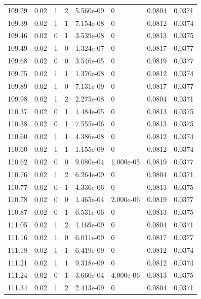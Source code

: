 \documentclass[preview]{standalone}
\begin{document}
{{{{{{{{{{{{{{{{{\begin{tabular}{L{1.2cm}C{1.2cm} C{0.3cm}C{0.5cm} C{1.4cm}C{1.4cm} C{1.4cm}C{1.4cm}}
  109.29  &  0.02  & 1     &  2 &  5.560e-09  & 0  & 0.0804 &  0.0371   \\ 
  109.39  &  0.02  & 1     &  1 &  7.154e-08  & 0  & 0.0812 &  0.0374   \\ 
  109.46  &  0.02  & 0     &  1 &  3.539e-08  & 0  & 0.0813 &  0.0375   \\ 
  109.49  &  0.02  & 1     &  0 &  1.324e-07  & 0  & 0.0817 &  0.0377   \\ 
  109.68  &  0.02  & 0     &  0 &  3.546e-05  & 0  & 0.0819 &  0.0377   \\ 
  109.75  &  0.02  & 1     &  1 &  1.370e-08  & 0  & 0.0812 &  0.0374   \\ 
  109.89  &  0.02  & 1     &  0 &  7.131e-09  & 0  & 0.0817 &  0.0377   \\ 
  109.98  &  0.02  & 1     &  2 &  2.275e-08  & 0  & 0.0804 &  0.0371   \\ 
  110.37  &  0.02  & 0     &  1 &  1.484e-05  & 0  & 0.0813 &  0.0375   \\ 
  110.38  &  0.02  & 0     &  1 &  7.555e-06  & 0  & 0.0813 &  0.0375   \\ 
  110.60  &  0.02  & 1     &  1 &  4.386e-08  & 0  & 0.0812 &  0.0374   \\ 
  110.60  &  0.02  & 1     &  1 &  1.155e-09  & 0  & 0.0812 &  0.0374   \\ 
  110.62  &  0.02  & 0     &  0 &  9.080e-04  & 1.000e-05  & 0.0819 &  0.0377   \\ 
  110.76  &  0.02  & 1     &  2 &  6.264e-09  & 0  & 0.0804 &  0.0371   \\ 
  110.77  &  0.02  & 0     &  1 &  4.336e-06  & 0  & 0.0813 &  0.0375   \\ 
  110.78  &  0.02  & 0     &  0 &  1.465e-04  & 2.000e-06  & 0.0819 &  0.0377   \\ 
  110.87  &  0.02  & 0     &  1 &  6.531e-06  & 0  & 0.0813 &  0.0375   \\ 
  111.05  &  0.02  & 1     &  2 &  1.169e-09  & 0  & 0.0804 &  0.0371   \\ 
  111.16  &  0.02  & 1     &  0 &  6.011e-09  & 0  & 0.0817 &  0.0377   \\ 
  111.18  &  0.02  & 1     &  1 &  6.419e-09  & 0  & 0.0812 &  0.0374   \\ 
  111.21  &  0.02  & 1     &  1 &  9.318e-09  & 0  & 0.0812 &  0.0374   \\ 
  111.24  &  0.02  & 0     &  1 &  3.660e-04  & 4.000e-06  & 0.0813 &  0.0375   \\ 
  111.34  &  0.02  & 1     &  2 &  2.413e-09  & 0  & 0.0804 &  0.0371   \\ 

\end{tabular}}}}}}}}}}}}}}}}}}
\end{document}

